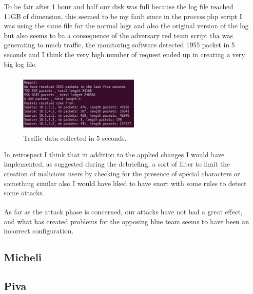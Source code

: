 \documentclass[14pt]{article}
\begin{document}
To be fair after 1 hour and half our disk was full because the log file reached 11GB of dimension, this seemed to be my fault since in the process.php script I was using the same file for the normal logs and also the original version of the log but also seems to ba a consequence of the adversary red team script tha was generating to much traffic, the monitoring software detected 1955 packet in 5 seconds and I think the very high number of request ended up in creating a very big log file.
\begin{figure}[!h]
	\centering
	\includegraphics[width=6cm,height=3cm]{dos_ctf_secure}
	\caption{Traffic data collected in 5 seconds.}
\end{figure}

In retrospect I think that in addition to the applied changes I would have implemented, as suggested during the debriefing, a sort of filter to limit the creation of malicious users by checking for the presence of special characters or something similar also I would have liked to have snort with some rules to detect some attacks. 
\\
\\
As far as the attack phase is concerned, our attacks have not had a great effect, and what has created problems for the opposing blue team seems to have been an incorrect configuration.

\subsection{Micheli}

\subsection{Piva}
\end{document}
